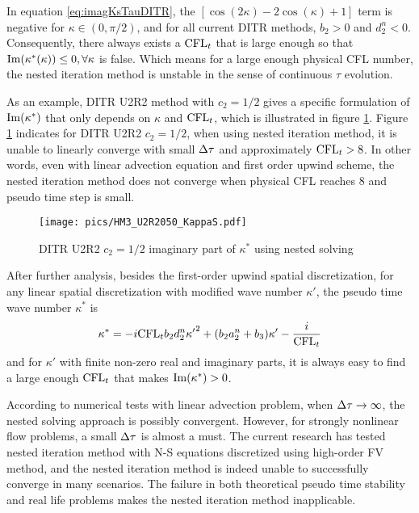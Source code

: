 \documentclass[preprint,12pt]{elsarticle}
\begin{document}
In equation \eqref{eq:imagKsTauDITR},
the $\left[\cos(2\kappa) -2\cos(\kappa) + 1\right]$ term
is negative for $\kappa \in (0, \pi/2)$, and for
all current DITR methods, $b_2>0$ and $d_2^n < 0$.
Consequently, there always exists a $\text{CFL}_t$ that is large enough
so that $\mathrm{Im}(\kappa^*(\kappa)) \leq 0, \forall \kappa$ is false.
Which means for a large enough physical CFL number, the nested
iteration method is unstable in the sense of continuous $\tau$
evolution.

As an example, DITR U2R2 method with $c_2=1/2$ gives
a specific formulation of $\mathrm{Im}(\kappa^*)$ that only depends on $\kappa$
and $\text{CFL}_t$, which is illustrated in figure \ref{fig:HM3_U2R2050_KappaS}.
Figure \ref{fig:HM3_U2R2050_KappaS} indicates for DITR U2R2 $c_2=1/2$,
when using nested iteration method, it is unable to linearly converge
with small $\mathrm\Delta \tau$ and approximately $\text{CFL}_t > 8$.
In other words, even with linear advection equation and first order upwind
scheme,
the nested iteration method does not converge when physical CFL reaches 8
and pseudo time step is small.

\begin{figure}[htbp]
    \centering
    \texttt{[image: pics/HM3\_U2R2050\_KappaS.pdf]}
    \caption[]{DITR U2R2 $c_2=1/2$ imaginary part of $\kappa^*$ using
        nested solving}
    \label{fig:HM3_U2R2050_KappaS}
\end{figure}

After further analysis,
besides the first-order upwind spatial discretization,
for any linear spatial discretization with modified wave number $\kappa'$,
the pseudo time wave number $\kappa^*$ is
\begin{equation}
    \begin{aligned}
        \kappa^* =
        -i\text{CFL}_t b_2 d_2^n {\kappa'}^2
        + (b_2a_2^n + b_3) \kappa' - \frac{i}{\text{CFL}_t}
    \end{aligned}
    \label{eq:imagKsTauDITR_General}
\end{equation}
and for $\kappa'$ with finite non-zero real and imaginary parts,
it is always easy to find a large enough $\text{CFL}_t$ that makes
$\mathrm{Im}(\kappa^*) > 0$.


According to numerical tests with linear advection problem,
when $\mathrm\Delta \tau \rightarrow \infty$, the nested solving
approach is possibly convergent. However, for strongly nonlinear
flow problems, a small $\mathrm\Delta \tau$ is almost a must.
The current research has tested nested iteration method
with N-S equations discretized using high-order FV method,
and the nested iteration method is indeed unable to successfully
converge in many scenarios.
The failure in both theoretical pseudo time stability and
real life problems makes
the nested iteration method inapplicable.
\end{document}
